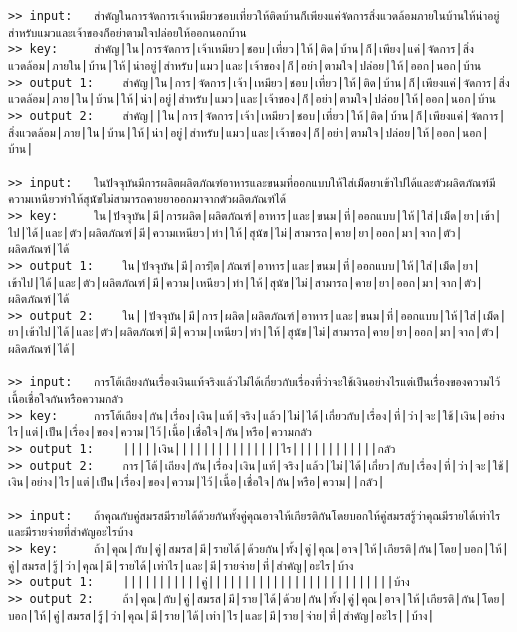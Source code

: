 \documentclass[11pt]{article}
\begin{document}
\begin{Verbatim}[commandchars=\\\{\}]
>> input:	สำคัญในการจัดการเจ้าเหมียวชอบเที่ยวให้ติดบ้านก็เพียงแค่จัดการสิ่งแวดล้อมภายในบ้านให้น่าอยู่สำหรับแมวและเจ้าของก็อย่าตามใจปล่อยให้ออกนอกบ้าน
>> key:		สำคัญ|ใน|การจัดการ|เจ้าเหมียว|ชอบ|เที่ยว|ให้|ติด|บ้าน|ก็|เพียง|แค่|จัดการ|สิ่งแวดล้อม|ภายใน|บ้าน|ให้|น่าอยู่|สำหรับ|แมว|และ|เจ้าของ|ก็|อย่า|ตามใจ|ปล่อย|ให้|ออก|นอก|บ้าน
>> output 1:	สำคัญ|ใน|การ|จัดการ|เจ้า|เหมียว|ชอบ|เที่ยว|ให้|ติด|บ้าน|ก็|เพียงแค่|จัดการ|สิ่งแวดล้อม|ภาย|ใน|บ้าน|ให้|น่า|อยู่|สำหรับ|แมว|และ|เจ้าของ|ก็|อย่า|ตามใจ|ปล่อย|ให้|ออก|นอก|บ้าน
>> output 2:	สำคัญ||ใน|การ|จัดการ|เจ้า|เหมียว|ชอบ|เที่ยว|ให้|ติด|บ้าน|ก็|เพียงแค่|จัดการ|สิ่งแวดล้อม|ภาย|ใน|บ้าน|ให้|น่า|อยู่|สำหรับ|แมว|และ|เจ้าของ|ก็|อย่า|ตามใจ|ปล่อย|ให้|ออก|นอก|บ้าน|

>> input:	ในปัจจุบันมีการผลิตผลิตภัณฑ์อาหารและขนมที่ออกแบบให้ใส่เม็ดยาเข้าไปได้และตัวผลิตภัณฑ์มีความเหนียวทำให้สุนัขไม่สามารถคายยาออกมาจากตัวผลิตภัณฑ์ได้
>> key:		ใน|ปัจจุบัน|มี|การผลิต|ผลิตภัณฑ์|อาหาร|และ|ขนม|ที่|ออกแบบ|ให้|ใส่|เม็ด|ยา|เข้า|ไป|ได้|และ|ตัว|ผลิตภัณฑ์|มี|ความเหนียว|ทำ|ให้|สุนัข|ไม่|สามารถ|คาย|ยา|ออก|มา|จาก|ตัว|ผลิตภัณฑ์|ได้
>> output 1:	ใน|ปัจจุบัน|มี|การ|ิต|ภัณฑ์|อาหาร|และ|ขนม|ที่|ออกแบบ|ให้|ใส่|เม็ด|ยา|เข้าไป|ได้|และ|ตัว|ผลิตภัณฑ์|มี|ความ|เหนียว|ทำ|ให้|สุนัข|ไม่|สามารถ|คาย|ยา|ออก|มา|จาก|ตัว|ผลิตภัณฑ์|ได้
>> output 2:	ใน||ปัจจุบัน|มี|การ|ผลิต|ผลิตภัณฑ์|อาหาร|และ|ขนม|ที่|ออกแบบ|ให้|ใส่|เม็ด|ยา|เข้าไป|ได้|และ|ตัว|ผลิตภัณฑ์|มี|ความ|เหนียว|ทำ|ให้|สุนัข|ไม่|สามารถ|คาย|ยา|ออก|มา|จาก|ตัว|ผลิตภัณฑ์|ได้|

>> input:	การ​โต้​เถียง​กัน​เรื่อง​เงินแท้​จริง​แล้ว​ไม่​ได้​เกี่ยว​กับ​เรื่อง​ที่​ว่า​จะ​ใช้​เงิน​อย่าง​ไรแต่​เป็น​เรื่อง​ของ​ความ​ไว้​เนื้อ​เชื่อใจ​กัน​หรือ​ความ​กลัว
>> key:		การ​โต้​เถียง|​กัน|​เรื่อง|​เงิน|แท้​|จริง|​แล้ว|​ไม่|​ได้|​เกี่ยว​กับ|​เรื่อง​|ที่​|ว่า|​จะ​|ใช้​|เงิน|​อย่าง​ไร|แต่​|เป็น|​เรื่อง|​ของ|​ความ|​ไว้|​เนื้อ​|เชื่อใจ​|กัน|​หรือ|​ความ​กลัว
>> output 1:	​|​|​|​|​|เงิน|​|​|​|​|​|​|​|​|​|​|​|​|​|​|ไร|​|​|​|​|​|​|​|​|​|​|​|กลัว
>> output 2:	การ|​โต้|​เถียง|​กัน|​เรื่อง|​เงิน|แท้|​จริง|​แล้ว|​ไม่|​ได้|​เกี่ยว|​กับ|​เรื่อง|​ที่|​ว่า|​จะ|​ใช้|​เงิน|​อย่าง|​ไร|แต่|​เป็น|​เรื่อง|​ของ|​ความ|​ไว้|​เนื้อ|​เชื่อใจ|​กัน|​หรือ|​ความ|​|กลัว|

>> input:	ถ้า​คุณ​กับ​คู่​สมรส​มี​ราย​ได้​ด้วย​กัน​ทั้ง​คู่คุณ​อาจ​ให้​เกียรติ​กัน​โดย​บอก​ให้​คู่​สมรส​รู้​ว่า​คุณ​มี​ราย​ได้​เท่า​ไร​และ​มี​ราย​จ่าย​ที่​สำคัญ​อะไร​บ้าง
>> key:		ถ้า​|คุณ​|กับ|​คู่​|สมรส|​มี|​ราย​ได้|​ด้วย​กัน|ทั้ง​|คู่|คุณ​|อาจ|​ให้|​เกียรติ|​กัน|​โดย|​บอก|​ให้|​คู่|​สมรส|​รู้|​ว่า|​คุณ|มี​|ราย​ได้|​เท่า​ไร|​และ|​มี|​ราย​จ่าย|​ที่|​สำคัญ|​อะไร|​บ้าง
>> output 1:	​|​|​|​|​|​|​|​|​|​|​|คู่|​|​|​|​|​|​|​|​|​|​|​|​|​|​|​|​|​|​|​|​|​|​|​|​|​|บ้าง
>> output 2:	ถ้า|​คุณ|​กับ|​คู่|​สมรส|​มี|​ราย|​ได้|​ด้วย|​กัน|​ทั้ง|​คู่|คุณ|​อาจ|​ให้|​เกียรติ|​กัน|​โดย|​บอก|​ให้|​คู่|​สมรส|​รู้|​ว่า|​คุณ|​มี|​ราย|​ได้|​เท่า|​ไร|​และ|​มี|​ราย|​จ่าย|​ที่|​สำคัญ|​อะไร|​|บ้าง|


\end{Verbatim}
\end{document}

